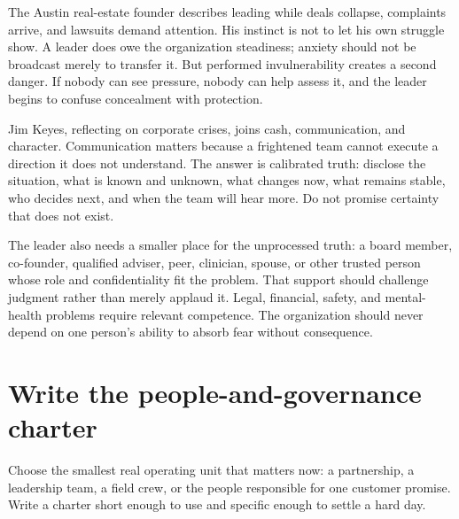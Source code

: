 The Austin real-estate founder describes leading while deals collapse,
complaints arrive, and lawsuits demand attention. His instinct is not to let
his own struggle show. A leader does owe the organization steadiness; anxiety
should not be broadcast merely to transfer it. But performed invulnerability
creates a second danger. If nobody can see pressure, nobody can help assess it,
and the leader begins to confuse concealment with protection.

Jim Keyes, reflecting on corporate crises, joins cash, communication, and
character. Communication matters because a frightened team cannot execute a
direction it does not understand. The answer is calibrated truth: disclose the
situation, what is known and unknown, what changes now, what remains stable,
who decides next, and when the team will hear more. Do not promise certainty
that does not exist.

The leader also needs a smaller place for the unprocessed truth: a board member,
co-founder, qualified adviser, peer, clinician, spouse, or other trusted person
whose role and confidentiality fit the problem. That support should challenge
judgment rather than merely applaud it. Legal, financial, safety, and mental-
health problems require relevant competence. The organization should never
depend on one person's ability to absorb fear without consequence.

\section{Write the people-and-governance charter}

Choose the smallest real operating unit that matters now: a partnership, a
leadership team, a field crew, or the people responsible for one customer
promise. Write a charter short enough to use and specific enough to settle a
hard day.

